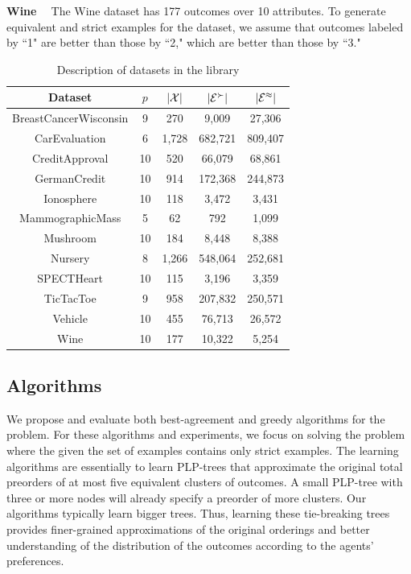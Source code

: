 \smallskip \noindent \textbf{Wine \ }
The Wine dataset has 177 outcomes over 10 attributes.
To generate equivalent and strict examples for the dataset,
we assume that outcomes labeled by ``1" are better than
those by ``2," which are better than those
by ``3."


\begin{table}
	\centering
	\small
	\begin{tabular}{ |c||c|c|c|c| } 
		\hline
		Dataset          & $p$  & $|\mathcal{X}|$ & $|\mathcal{E}^\succ|$ & $|\mathcal{E}^\approx|$ \\
		\hline \hline
		BreastCancerWisconsin              & 9    & 270 & 9,009 & 27,306 \\ \hline
		CarEvaluation               & 6    & 1,728 & 682,721 & 809,407\\ \hline
		CreditApproval               & 10   & 520 & 66,079 & 68,861 \\ \hline
		GermanCredit               & 10   & 914 & 172,368 & 244,873 \\ \hline
		Ionosphere               & 10   & 118 & 3,472 & 3,431 \\	\hline
		MammographicMass               & 5    & 62 & 792 & 1,099 \\	\hline
		Mushroom               & 10   & 184 & 8,448 & 8,388 \\	\hline
		Nursery               & 8    & 1,266 & 548,064 & 252,681 \\	\hline
		SPECTHeart               & 10   & 115 & 3,196 & 3,359 \\	\hline
		TicTacToe              & 9    & 958 & 207,832 & 250,571 \\ \hline
		Vehicle               & 10   & 455 & 76,713 & 26,572 \\ \hline
		Wine               & 10   & 177 & 10,322 & 5,254 \\
		\hline
	\end{tabular}
	\caption{Description of datasets in the library}
	\label{tbl:description}
\end{table}


\subsection{Algorithms}
\label{sec:algs}
We propose and evaluate both best-agreement and 
greedy algorithms for the  problem. 
For these algorithms and experiments, we focus on solving the
 problem where the given the set of examples
contains only strict examples.
The learning algorithms are essentially to learn PLP-trees that
approximate the original total preorders of at most five
equivalent clusters of outcomes.
A small PLP-tree with three or more nodes will already specify
a preorder of more clusters.
Our algorithms typically learn bigger trees.
Thus, learning these tie-breaking trees provides finer-grained
approximations of the original orderings and better
understanding of the distribution of the outcomes according
to the agents' preferences.


